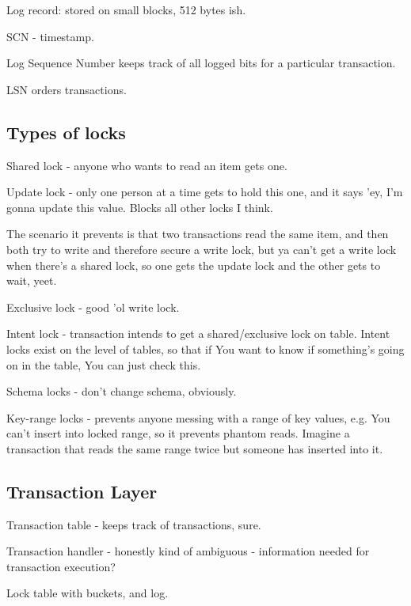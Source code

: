 \documentclass{article}
\begin{document}
		Log record: stored on small blocks, 512 bytes ish.
		
		SCN - timestamp.
		
		Log Sequence Number keeps track of all logged bits for a particular transaction.
		
		LSN orders transactions.
		
	\subsection{Types of locks}
	
		Shared lock - anyone who wants to read an item gets one.
		
		Update lock - only one person at a time gets to hold this one, and it says 'ey, I'm gonna update this value. Blocks all other locks I think.
		
		The scenario it prevents is that two transactions read the same item, and then both try to write and therefore secure a write lock, but ya can't get a write lock when there's a shared lock, so one gets the update lock and the other gets to wait, yeet.
		
		Exclusive lock - good 'ol write lock.
		
		Intent lock - transaction intends to get a shared/exclusive lock on table. Intent locks exist on the level of tables, so that if You want to know if something's going on in the table, You can just check this.
		
		Schema locks - don't change schema, obviously.
		
		Key-range locks - prevents anyone messing with a range of key values, e.g. You can't insert into locked range, so it prevents phantom reads. Imagine a transaction that reads the same range twice but someone has inserted into it.
		
	\subsection{Transaction Layer}
	
		Transaction table - keeps track of transactions, sure. 
		
		Transaction handler - honestly kind of ambiguous - information needed for transaction execution?
		
		Lock table with buckets, and log. 
		
		
		
		
		
		
		
		
		
\end{document}
